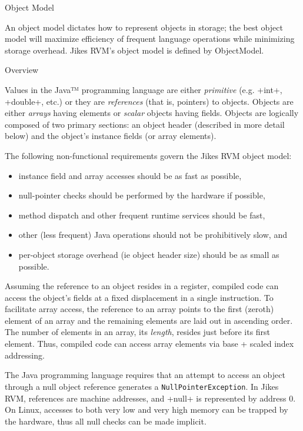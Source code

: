 \begin{section}{Object Model}
\label{sec:objectmodel}

An object model dictates how to represent objects in storage; the best object model will maximize efficiency of frequent language operations while minimizing storage overhead. Jikes RVM's object model is defined by ObjectModel.

\begin{subsection}{Overview}

Values in the Java™ programming language are either \textit{primitive} (e.g. \spverb+int+, \spverb+double+, etc.) or they are \textit{references} (that is, pointers) to objects. Objects are either \textit{arrays} having elements or \textit{scalar} objects having fields. Objects are logically composed of two primary sections: an object header (described in more detail below) and the object's instance fields (or array elements).

The following non-functional requirements govern the Jikes RVM object model:
\begin{itemize}
  \item instance field and array accesses should be as fast as possible,
  \item null-pointer checks should be performed by the hardware if possible,
  \item method dispatch and other frequent runtime services should be fast,
  \item other (less frequent) Java operations should not be prohibitively slow, and
  \item per-object storage overhead (ie object header size) should be as small as possible.
\end{itemize}

Assuming the reference to an object resides in a register, compiled code can access the object's fields at a fixed displacement in a single instruction. To facilitate array access, the reference to an array points to the first (zeroth) element of an array and the remaining elements are laid out in ascending order. The number of elements in an array, its \textit{length}, resides just before its first element. Thus, compiled code can access array elements via base + scaled index addressing.

The Java programming language requires that an attempt to access an object through a null object reference generates a \texttt{NullPointerException}. In Jikes RVM, references are machine addresses, and \spverb+null+ is represented by address $0$. On Linux, accesses to both very low and very high memory can be trapped by the hardware, thus all null checks can be made implicit.


\end{subsection}
\end{section}
